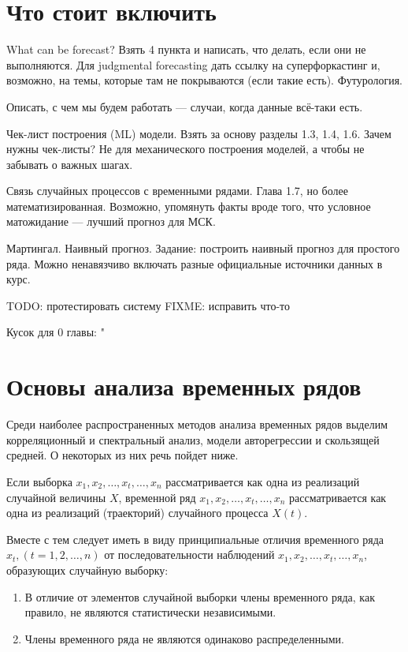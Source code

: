 \section{Что стоит включить}

What can be forecast? Взять 4 пункта и написать, что делать, если они
не выполняются. Для judgmental forecasting дать ссылку на
суперфоркастинг и, возможно, на темы, которые там не покрываются
(если такие есть). Футурология.

Описать, с чем мы будем работать — случаи, когда данные всё-таки есть.

Чек-лист построения (ML) модели. Взять за основу разделы 1.3, 1.4,
1.6. Зачем нужны чек-листы? Не для механического построения моделей,
а чтобы не забывать о важных шагах.

Связь случайных процессов с временными рядами. Глава 1.7, но более
математизированная. Возможно, упомянуть факты вроде того, что
условное матожидание — лучший прогноз для МСК.

Мартингал. Наивный прогноз.
Задание: построить наивный прогноз для простого ряда. Можно
ненавязчиво включать разные официальные источники данных в курс.

TODO: протестировать систему
FIXME: исправить что-то

Кусок для 0 главы:
"
\section{Основы анализа временных рядов}

Среди наиболее распространенных методов анализа временных рядов выделим корреляционный и спектральный анализ, модели авторегрессии и скользящей средней. О некоторых из них речь пойдет ниже.

Если выборка $x_1, x_2, \ldots, x_t, \ldots, x_n$ рассматривается как одна из реализаций случайной величины $X$, временной ряд $x_1, x_2, \ldots, x_t, \ldots, x_n$ рассматривается как одна из реализаций (траекторий) случайного процесса $X(t)$.

Вместе с тем следует иметь в виду принципиальные отличия временного ряда $x_t, (t = 1, 2, \ldots, n)$ от последовательности наблюдений $x_1, x_2, \ldots, x_t, \ldots, x_n$, образующих случайную выборку:

\begin{enumerate}
    \item В отличие от элементов случайной выборки члены временного ряда, как правило, не являются статистически независимыми.
    \item Члены временного ряда не являются одинаково распределенными.
\end{enumerate}

